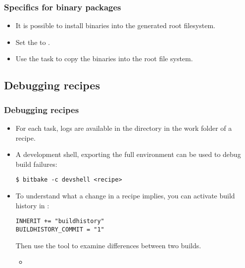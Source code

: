 \begin{frame}
  \frametitle{Specifics for binary packages}
  \begin{itemize}
    \item It is possible to install binaries into the generated root
      filesystem.
    \item Set the  to .
    \item Use the  task to copy the binaries into the
      root file system.
  \end{itemize}
\end{frame}

\subsection{Debugging recipes}

\begin{frame}[fragile]
  \frametitle{Debugging recipes}
  \begin{itemize}
    \item For each task, logs are available in the 
      directory in the work folder of a recipe.
    \item A development shell, exporting the full environment can be
      used to debug build failures:
      \begin{block}{}
        \begin{verbatim}
$ bitbake -c devshell <recipe>
        \end{verbatim}
      \end{block}
    \item To understand what a change in a recipe implies, you can
      activate build history in :
      \begin{block}{}
        \begin{verbatim}
INHERIT += "buildhistory"
BUILDHISTORY_COMMIT = "1"
        \end{verbatim}
      \end{block}
      Then use the  tool to examine
      differences between two builds.
      \begin{itemize}
        \item {}
      \end{itemize}
  \end{itemize}
\end{frame}
